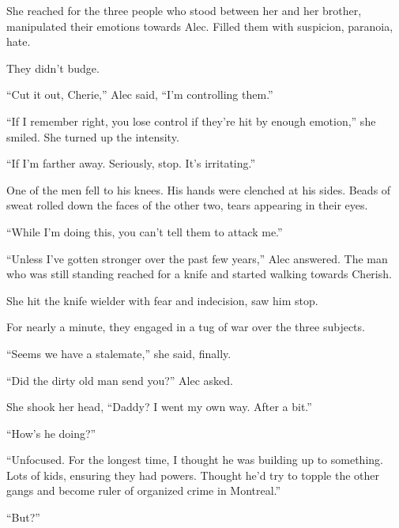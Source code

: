 She reached for the three people who stood between her and her brother, manipulated their emotions towards Alec.  Filled them with suspicion, paranoia, hate.



They didn't budge.



``Cut it out, Cherie,'' Alec said, ``I'm controlling them.''



``If I remember right, you lose control if they're hit by enough emotion,'' she smiled.  She turned up the intensity.



``If I'm farther away.  Seriously, stop.  It's irritating.''



One of the men fell to his knees.  His hands were clenched at his sides.  Beads of sweat rolled down the faces of the other two, tears appearing in their eyes.



``While I'm doing this, you can't tell them to attack me.''



``Unless I've gotten stronger over the past few years,'' Alec answered.  The man who was still standing reached for a knife and started walking towards Cherish.



She hit the knife wielder with fear and indecision, saw him stop.



For nearly a minute, they engaged in a tug of war over the three subjects.



``Seems we have a stalemate,'' she said, finally.



``Did the dirty old man send you?'' Alec asked.



She shook her head, ``Daddy?  I went my own way.  After a bit.''



``How's he doing?''



``Unfocused.  For the longest time, I thought he was building up to something.  Lots of kids, ensuring they had powers.  Thought he'd try to topple the other gangs and become ruler of organized crime in Montreal.''



``But?''



